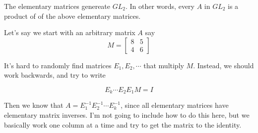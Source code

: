 \documentclass[11pt]{article}
\begin{document}
\begin{theorem}
    The elementary matrices genereate $GL_2$. In other words, every $A$ in $GL_2$ is a product of of the above elementary matrices.
\end{theorem}

Let's say we start with an arbitrary matrix $A$ say
\[ M = 
    \begin{bmatrix}
    8 & 5 \\
    4 & 6
    \end{bmatrix}
\]

It's hard to randomly find matrices $E_1, E_2, \cdots $ that multiply $M$. Instead, we should work backwards, and try to write 

\[
E_k \cdots E_2 E_1 M = I
\]

Then we know that $A = E_1^{-1}E_2^{-1}\cdots E_k^{-1}$, since all elementary matrices have elementary matrix inverses. I'm not going to include how to do this here, but we basically work one column at a time and try to get the matrix to the identity.
\end{document}
